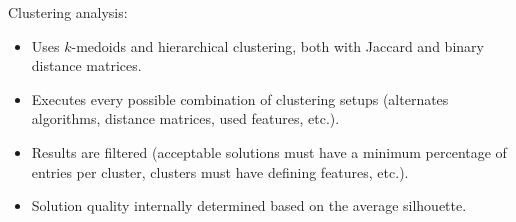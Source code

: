 \documentclass[xcolor=dvipsnames]{beamer}
\begin{document}
\begin{frame}[allowframebreaks]
\framebreak

Clustering analysis:
\begin{itemize}
\item
Uses $k$-medoids and hierarchical clustering, both with Jaccard and binary
distance matrices.

\item
Executes every possible combination of clustering setups (alternates algorithms,
distance matrices, used features, etc.).

\item
Results are filtered (acceptable solutions must have a minimum percentage of
entries per cluster, clusters must have defining features, etc.).

\item
Solution quality internally determined based on the average silhouette.
\end{itemize}








\end{frame}
\end{document}
